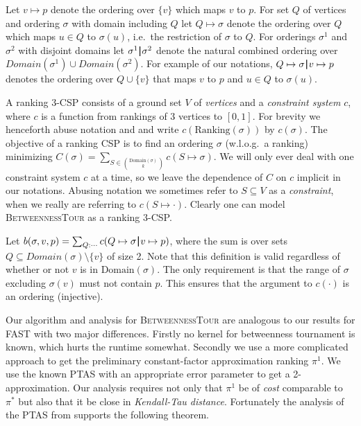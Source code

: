 \documentclass[envcountsame,oribibl]{llncs}
\newcommand{\set}[1]{\{#1\}}                        \newcommand{\setof}[2]{\{\,{#1}\::\:{#2}\,\}}        \newcommand{\groupFrac}[2]{\left(\frac{#1}{#2}\right)}
\newcommand{\sm}{\setminus} \newcommand{\compl}[1]{\overline{#1}}                \newcommand{\floor}[1]{\left\lfloor #1 \right\rfloor}
\newcommand{\bp}{\,\rule[-0.22em]{0.08em}{1em}\,}
\newcommand{\betTour}{\textsc{BetweennessTour}}
\newcommand{\fast}{\textsc{FAST}}
\begin{document}
Let $v \mapsto p$ denote the ordering over $\set{v}$ which maps $v$ to $p$.
For set $Q$ of vertices and ordering $\sigma$ with domain including $Q$ let $Q \mapsto \sigma$ denote the ordering over $Q$ which maps $u \in Q$ to $\sigma(u)$, i.e.\ the restriction of $\sigma$ to $Q$. For orderings $\sigma^1$ and $\sigma^2$ with disjoint domains let  $\sigma^1\bp \sigma^2$ denote the natural combined ordering over $Domain(\sigma^1) \cup Domain(\sigma^2)$. For example of our notations, $Q \mapsto \sigma \bp v \mapsto p$ denotes the ordering over $Q \cup \set{v}$ that maps $v$ to $p$ and $u \in Q$ to $\sigma(u)$.

A ranking 3-CSP consists of a ground set $V$ of \emph{vertices} and a \emph{constraint system} $c$, where $c$ is a function from rankings of 3 vertices to $[0,1]$. For brevity we henceforth abuse notation and and write $c(\text{Ranking}(\sigma))$ by $c(\sigma)$. The objective of a ranking CSP is to find an ordering $\sigma$ (w.l.o.g.\ a ranking) minimizing $C(\sigma) = \sum_{S \in \binom{\text{Domain}(\sigma)}{k}} c(S \mapsto \sigma)$. We will only ever deal with one constraint system $c$ at a time, so we leave the dependence of $C$ on $c$ implicit in our notations. Abusing notation we sometimes refer to $S \subseteq V$ as a \emph{constraint}, when we really are referring to $c(S \mapsto \cdot)$.
Clearly one can model \betTour{} as a ranking 3-CSP.

Let $b(\sigma, v, p) = \sum_{Q : \cdots} c(Q \mapsto \sigma \bp v \mapsto p)$, where the sum is over sets $Q \subseteq Domain(\sigma) \sm \set{v}$ of size 2. Note that this definition is valid regardless of whether or not $v$ is in $\text{Domain}(\sigma)$. The only requirement is that the range of $\sigma$ excluding $\sigma(v)$ must not contain $p$. This ensures that the argument to $c(\cdot)$ is an ordering (injective). 

Our algorithm and analysis for \betTour{} are analogous to our results for \fast{} with two major differences. Firstly no kernel for betweenness tournament is known, which hurts the runtime somewhat. Secondly we use a more complicated approach to get the preliminary constant-factor approximation ranking $\pi^1$.
We use the known PTAS \cite{Karpinski09betweenness} with an appropriate error parameter to get a 2-approximation. Our analysis requires not only that $\pi^1$ be of \emph{cost} comparable to $\pi^*$ but also that it be close in \emph{Kendall-Tau distance}. Fortunately the analysis of the PTAS from \cite{Karpinski09betweenness} supports the following theorem.
\end{document}
